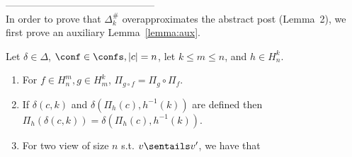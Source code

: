 \newcommand{\imap}{h}
\newcommand{\imapf}{f}
\newcommand{\imapg}{g}
\newcommand{\imapplus}{h_+}
\newcommand{\imapminus}{h_-}
\newcommand{\imapprime}{h'}
\newcommand{\imapsof}[2]{H_{#1}^{#2}}
\renewcommand{\proj}[2]{\Pi_{#1}(#2)}
\renewcommand{\apost}{\Delta^{\#}_k}
---------------------------------------------\\
In order to prove that $\apost$ overapproximates the abstract post (Lemma~2), we first prove an auxiliary Lemma~\ref{lemma:aux}.
\begin{lemma}\label{lemma:aux}
Let $\delta\in\Delta$, 
$\conf\in\confs,|c|=n$, let $k \leq m \leq n$,
and $\imap\in \imapsof n k$.
\begin{enumerate}
\item\label{item:composition}
For $\imapf\in \imapsof {n} {m}, \imapg\in \imapsof {m} {k}$, $\Pi_{\imapg\circ\imapf} = \Pi_{\imapg} \circ \Pi_\imapf$.
\item\label{item:samepost}
If $\delta(c,k)$ and $\delta(\proj \imap c ,\imap^{-1}(k))$ are defined then
$\proj \imap {\delta (c,k)} = \delta (\proj \imap {c}, \imap^{-1}(k))$.
\item\label{item:monotonicity}
For two view of size $n$ s.t. $v\sentails v'$, we have that 
\end{enumerate}
\end{lemma}
